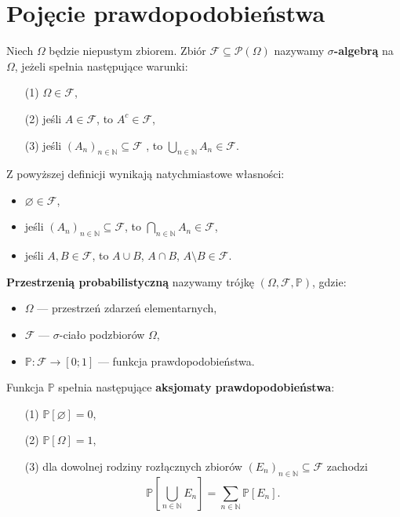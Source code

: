 \section{Pojęcie prawdopodobieństwa}

\begin{definition}
Niech $\Omega$ będzie niepustym zbiorem.  
Zbiór $\mathcal{F} \subseteq \mathcal{P}(\Omega)$ nazywamy  \textbf{$\sigma$-algebrą} na $\Omega$, jeżeli spełnia następujące warunki:
\begin{itemize}
    \item[(1)] $\Omega \in \mathcal{F}$,
    \item[(2)] jeśli $A \in \mathcal{F}$, to $A^c \in \mathcal{F}$,
    \item[(3)] jeśli $(A_n)_{n \in \mathbb{N}} \subseteq \mathcal{F}$ , to $\bigcup_{n \in \mathbb{N}} A_n \in \mathcal{F}$.
\end{itemize}
\end{definition}

\begin{fact}\label{F:sigma_algebra}
Z powyższej definicji wynikają natychmiastowe własności:
\begin{itemize}
    \item $\varnothing \in \mathcal{F}$,
    \item jeśli $(A_n)_{n \in \mathbb{N}} \subseteq \mathcal{F}$, to  $\bigcap_{n \in \mathbb{N}} A_n \in \mathcal{F}$,
    \item jeśli $A, B \in \mathcal{F}$, to $A \cup B$, $A \cap B$, $A \setminus B\in \mathcal{F}$.
\end{itemize}
\end{fact}

\begin{definition}
\textbf{Przestrzenią probabilistyczną} nazywamy trójkę $(\Omega, \mathcal{F}, \mathbb{P})$, gdzie:
\begin{itemize}
    \item $\Omega$ — przestrzeń zdarzeń elementarnych,
    \item $\mathcal{F}$ — $\sigma$-ciało podzbiorów $\Omega$,
    \item $\mathbb{P}:\mathcal{F}\to [0;1]$ — funkcja prawdopodobieństwa.
\end{itemize}
\end{definition}

\noindent
Funkcja $\mathbb{P}$ spełnia następujące \textbf{aksjomaty prawdopodobieństwa}:
\begin{itemize}
    \item[(1)] $\mathbb{P}[\varnothing] = 0$,
    \item[(2)] $\mathbb{P}[\Omega] = 1$,
    \item[(3)] dla dowolnej rodziny rozłącznych zbiorów $(E_n)_{n \in \mathbb{N}} \subseteq \mathcal{F}$ zachodzi
    \[
        \mathbb{P}\left[\bigcup_{n \in \mathbb{N}} E_n\right] = \sum_{n \in \mathbb{N}} \mathbb{P}[E_n].
    \]
\end{itemize}

